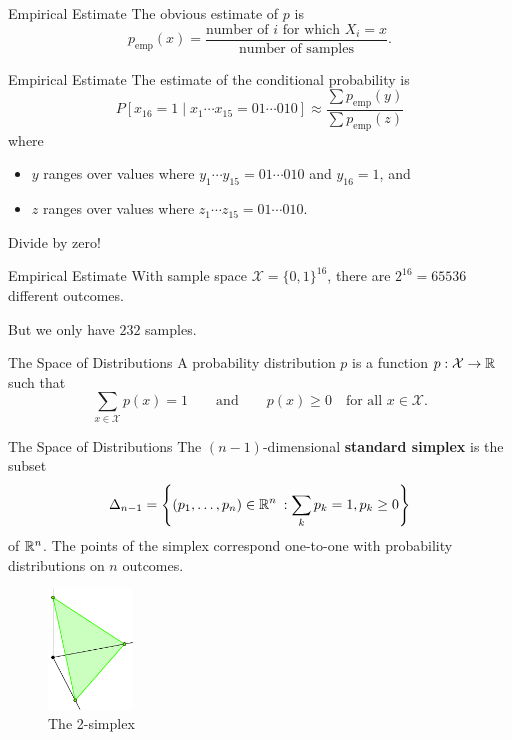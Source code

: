 \documentclass[xcolor=dvipsnames]{beamer}
\newcommand*{\xs}{\mathcal{X}}
\newcommand*{\emp}{\mathrm{emp}}
\begin{document}
\begin{frame}{Empirical Estimate}
    The obvious estimate of $p$ is
    \[
        p_\emp(x) = 
        \frac{
            \text{number of $i$ for which $X_i = x$}
        }{
            \text{number of samples}
        }.
    \]
\end{frame}

\begin{frame}{Empirical Estimate}
    The estimate of the conditional probability is 
    \[
        P[ x_{16} = 1 \mid x_1 \cdots x_{15} = 01\cdots010]
        \approx
        \frac{ \sum p_\emp(y) }{ \sum p_\emp(z) }
    \]
    where 
    \nlspace
    \begin{itemize}\nospace
    \item $y$ ranges over values where $y_1\cdots y_{15} = 01\cdots010$ and $y_{16} = 1$, and
    \item $z$ ranges over values where $z_1\cdots z_{15} = 01\cdots010$.
    \end{itemize}

    Divide by zero!
\end{frame}

\begin{frame}{Empirical Estimate}
    With sample space $\xs = \{0, 1\}^{16}$, there are $2^{16} = 65536$
    different outcomes.

    But we only have $232$ samples.
\end{frame}

\begin{frame}{The Space of Distributions}
    A probability distribution $p$ is a function $p : \xs \to \R$ such that
    \[
        \sum_{x \in \xs} p(x) = 1
        \qquad\text{and}\qquad
        p(x) \ge 0 \quad\text{for all $x \in \xs$}.
    \]
\end{frame}

\begin{frame}{The Space of Distributions}
    \lspace
    The $(n-1)$-dimensional \textbf{standard simplex} is the subset
    \[
        \Delta_{n-1} = \cdel*{ (p_1, \ldots, p_n) \in \R^{n} \:: \sum_k p_k= 1, p_k \ge 0 }
    \]
    of $\R^n$.  The points of the simplex correspond one-to-one with probability
    distributions on $n$ outcomes.
    \nlspace
    \begin{figure}\centering
        \includegraphics[width=0.2\textwidth]{2-simplex.pdf} 
        \caption{The 2-simplex}
    \end{figure}
\end{frame}
\end{document}
